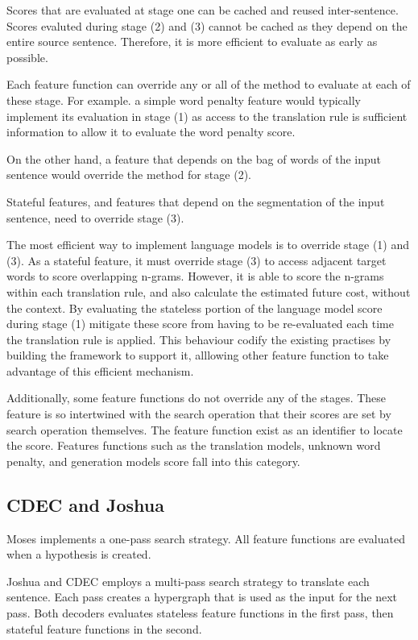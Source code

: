\documentclass{pbml}
\begin{document}
Scores that are evaluated at stage one can be cached and reused inter-sentence. Scores evaluted during stage (2) and (3) cannot be cached as they depend on the entire source sentence. Therefore, it is more efficient to evaluate as early as possible.

Each feature function can override any or all of the method to evaluate at each of these stage. For example. a simple word penalty feature would typically implement its evaluation in stage (1) as access to the translation rule is sufficient information to allow it to evaluate the word penalty score.

On the other hand, a feature that depends on the bag of words of the input sentence would override the method for stage (2).

Stateful features, and features that depend on the segmentation of the input sentence, need to override stage (3).

The most efficient way to implement language models is to override stage (1) and (3). As a stateful feature, it must override stage (3) to access adjacent target words to score overlapping n-grams. However, it is able to score the n-grams within each translation rule, and also calculate the estimated future cost, without the context. By evaluating the stateless portion of the language model score during stage (1) mitigate these score from having to be re-evaluated each time the translation rule is applied. This behaviour codify the existing practises by building the framework to support it, alllowing other feature function to take advantage of this efficient mechanism.

Additionally, some feature functions do not override any of the stages. These feature is so intertwined with the search operation that their scores are set by search operation themselves. The feature function exist as an identifier to locate the score. Features functions such as the translation models, unknown word penalty, and generation models score fall into this category.

\subsection{CDEC and Joshua}
Moses implements a one-pass search strategy. All feature functions are evaluated when a hypothesis is created.

Joshua and CDEC employs a multi-pass search strategy to translate each sentence. Each pass creates a hypergraph that is used as the input for the next pass. Both decoders evaluates stateless feature functions in the first pass, then stateful feature functions in the second.
\end{document}
